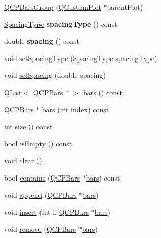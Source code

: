 \begin{DoxyCompactItemize}
\item 
\hyperlink{classQCPBarsGroup_aa4e043b9a22c6c5ea0f93740aca063e1}{Q\+C\+P\+Bars\+Group} (\hyperlink{classQCustomPlot}{Q\+Custom\+Plot} $\ast$parent\+Plot)
\item 
\hyperlink{classQCPBarsGroup_a4c0521120a97e60bbca37677a37075b6}{Spacing\+Type} {\bfseries spacing\+Type} () const \hypertarget{classQCPBarsGroup_a1bb562f669d47bd7d3cdd2da1f7d8f00}{}\label{classQCPBarsGroup_a1bb562f669d47bd7d3cdd2da1f7d8f00}

\item 
double {\bfseries spacing} () const \hypertarget{classQCPBarsGroup_a730bffefcac6c97aaf60e6f64dd3bcd9}{}\label{classQCPBarsGroup_a730bffefcac6c97aaf60e6f64dd3bcd9}

\item 
void \hyperlink{classQCPBarsGroup_a2c7e2d61b10594a4555b615e1fcaf49e}{set\+Spacing\+Type} (\hyperlink{classQCPBarsGroup_a4c0521120a97e60bbca37677a37075b6}{Spacing\+Type} spacing\+Type)
\item 
void \hyperlink{classQCPBarsGroup_aa553d327479d72a0c3dafcc724a190e2}{set\+Spacing} (double spacing)
\item 
Q\+List$<$ \hyperlink{classQCPBars}{Q\+C\+P\+Bars} $\ast$ $>$ \hyperlink{classQCPBarsGroup_a7c72ed1f8cd962c93b8c42ab96cd91ec}{bars} () const 
\item 
\hyperlink{classQCPBars}{Q\+C\+P\+Bars} $\ast$ \hyperlink{classQCPBarsGroup_a72d022790b7c93151c95c28eefaf51b4}{bars} (int index) const 
\item 
int \hyperlink{classQCPBarsGroup_af07364189c5717a158ec95b609687532}{size} () const 
\item 
bool \hyperlink{classQCPBarsGroup_a1d89da4e9176f4f77105e9a4afd44e2b}{is\+Empty} () const 
\item 
void \hyperlink{classQCPBarsGroup_a3ddf23928c6cd89530bd34ab7ba7b177}{clear} ()
\item 
bool \hyperlink{classQCPBarsGroup_adb4837894167e629e42e200db056fac3}{contains} (\hyperlink{classQCPBars}{Q\+C\+P\+Bars} $\ast$\hyperlink{classQCPBarsGroup_a7c72ed1f8cd962c93b8c42ab96cd91ec}{bars}) const 
\item 
void \hyperlink{classQCPBarsGroup_a809ed63cc4ff7cd5b0b8c96b470163d3}{append} (\hyperlink{classQCPBars}{Q\+C\+P\+Bars} $\ast$\hyperlink{classQCPBarsGroup_a7c72ed1f8cd962c93b8c42ab96cd91ec}{bars})
\item 
void \hyperlink{classQCPBarsGroup_a309a5f7233db189f3ea9c2d04ece6c13}{insert} (int i, \hyperlink{classQCPBars}{Q\+C\+P\+Bars} $\ast$\hyperlink{classQCPBarsGroup_a7c72ed1f8cd962c93b8c42ab96cd91ec}{bars})
\item 
void \hyperlink{classQCPBarsGroup_a215e28a5944f1159013a0e19169220e7}{remove} (\hyperlink{classQCPBars}{Q\+C\+P\+Bars} $\ast$\hyperlink{classQCPBarsGroup_a7c72ed1f8cd962c93b8c42ab96cd91ec}{bars})
\end{DoxyCompactItemize}
